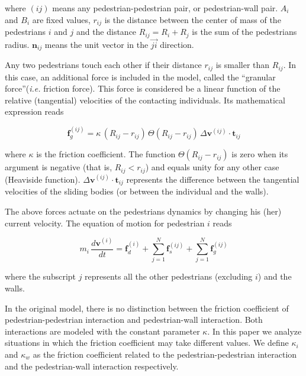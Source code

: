 where $(ij)$ means any pedestrian-pedestrian pair, or pedestrian-wall 
pair. $A_i$ and $B_i$ are fixed values, $r_{ij}$ is the distance between  the 
center of mass of the pedestrians $i$ and $j$ and the distance $R_{ij}=R_i+R_j$ 
is the sum of the pedestrians radius. $\mathbf{n}_{ij}$ means the unit vector in 
the $\vec{ji}$ direction.

Any two pedestrians touch each other if their distance $r_{ij}$ is smaller than 
$R_{ij}$.  In this case, an additional force is included in the model, called 
the ``granular force''(\textit{i.e.} friction force). This force is considered be a linear function of the 
relative (tangential) velocities of the contacting individuals. Its mathematical 
expression reads 

\begin{equation}
        \mathbf{f}_g^{(ij)} = 
\kappa\,(R_{ij}-r_{ij})\,\Theta(R_{ij}-r_{ij})\,\Delta
\mathbf{v}^{(ij)}\cdot\mathbf{t}_{ij} 
        \label{granular}
\end{equation}

where $\kappa$ is the friction coefficient. The function 
$\Theta(R_{ij}-r_{ij})$ is zero when its argument is negative (that is, 
$R_{ij}<r_{ij}$) and equals unity for any other case (Heaviside function). 
$\Delta\mathbf{v}^{(ij)}\cdot\mathbf{t}_{ij}$ represents the difference between 
the tangential velocities of the sliding bodies (or between the individual and 
the walls).   

The above forces actuate on the pedestrians dynamics by changing his (her) 
current velocity. The equation of motion for pedestrian $i$ reads

\begin{equation}
m_i\,\displaystyle\frac{d\mathbf{v}^{(i)}}{dt}=\mathbf{f}_d^{(i)}
+\displaystyle\sum_{j=1}^{N}\displaystyle\mathbf{f}_s^{(ij)}
+\displaystyle\sum_ {
j=1}^{N}\mathbf{f}_g^{(ij)}\label{eq_mov}
\end{equation}

where the subscript $j$ represents all the other pedestrians 
(excluding $i$) and the walls.

In the original model, there is no distinction between the friction coefficient of pedestrian-pedestrian interaction and pedestrian-wall interaction. Both interactions are modeled with the constant parameter $\kappa$. In this paper we analyze situations in which the friction coefficient may take different values. We define $\kappa_i$ and $\kappa_w$ as the friction coefficient related to the pedestrian-pedestrian interaction and the pedestrian-wall interaction respectively. 

